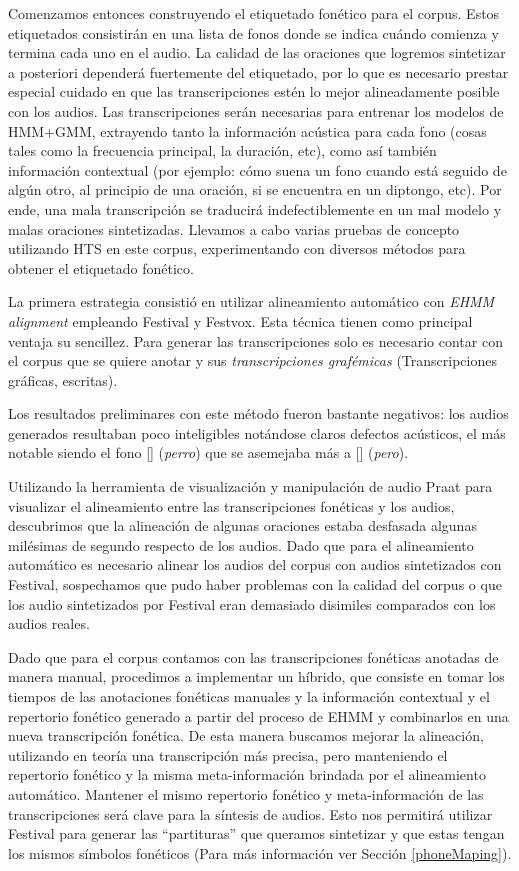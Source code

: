 Comenzamos entonces construyendo el etiquetado fonético para el corpus. Estos etiquetados consistirán en una lista de fonos donde se indica cuándo comienza y termina cada uno en el audio. La calidad de las oraciones que logremos sintetizar a posteriori dependerá fuertemente del etiquetado, por lo que es necesario prestar especial cuidado en que las transcripciones estén lo mejor alineadamente posible con los audios. Las transcripciones serán necesarias para entrenar los modelos de HMM+GMM, extrayendo tanto la información acústica para cada fono (cosas tales como la frecuencia principal, la duración, etc), como así también información contextual (por ejemplo: cómo suena un fono cuando está seguido de algún otro, al principio de una oración, si se encuentra en un diptongo, etc). Por ende, una mala transcripción se traducirá indefectiblemente en un mal modelo y malas oraciones sintetizadas. Llevamos a cabo varias pruebas de concepto utilizando HTS en este corpus, experimentando con diversos métodos para obtener el etiquetado fonético. 

La primera estrategia consistió en utilizar alineamiento automático con \textit{EHMM alignment} \cite{phoneticCapturing} empleando Festival y Festvox. Esta técnica tienen como principal ventaja su sencillez. Para generar las transcripciones solo es necesario contar con el corpus que se quiere anotar y sus \textit{transcripciones grafémicas} (Transcripciones gráficas, escritas).

Los resultados preliminares con este método fueron bastante negativos: los audios generados resultaban poco inteligibles notándose claros defectos acústicos, el más notable siendo el fono [] (\textit{perro}) que se asemejaba más a [] (\textit{pero}).

Utilizando la herramienta de visualización y manipulación de audio Praat \cite{praat} para visualizar el alineamiento entre las transcripciones fonéticas y los audios, descubrimos que la alineación de algunas oraciones estaba desfasada algunas milésimas de segundo respecto de los audios. Dado que para el alineamiento automático es necesario alinear los audios del corpus con audios sintetizados con Festival, sospechamos que pudo haber problemas con la calidad del corpus o que los audio sintetizados por Festival eran demasiado disimiles comparados con los audios reales. 

Dado que para el corpus contamos con las transcripciones fonéticas anotadas de manera manual, procedimos a implementar un híbrido, que consiste en tomar los tiempos de las anotaciones fonéticas manuales y la información contextual y el repertorio fonético generado a partir del proceso de EHMM y combinarlos en una nueva transcripción fonética. De esta manera buscamos mejorar la alineación, utilizando en teoría una transcripción más precisa, pero manteniendo el repertorio fonético y la misma meta-información brindada por el alineamiento automático. Mantener el mismo repertorio fonético y meta-información de las transcripciones será clave para la síntesis de audios. Esto nos permitirá utilizar Festival para generar las ``partituras'' que queramos sintetizar y que estas tengan los mismos símbolos fonéticos (Para más información ver Sección \ref{phoneMaping}).


